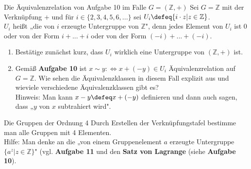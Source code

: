 \documentclass{uebblatt}
\begin{document}
\begin{aufgabe}{Die Äquivalenzrelation von Aufgabe 10 im Falle $G = (\mathbb{Z}, +)$}
Sei $G = \mathbb{Z}$ mit der Verknüpfung $+$ und für $i \in \{2, 3, 4, 5, 6, ...\}$ sei $U_i \defeq \{i \cdot z | z \in \mathbb{Z}\}$.\\
$U_i$ heißt „die von $i$ erzeugte Untergruppe von $\mathbb{Z}$", denn jedes Element von $U_i$ ist 0 oder von der Form $i + ... + i$ oder von der Form $(-i) + ... + (-i)$. 
\begin{enumerate}
\item Bestätige zunächst kurz, dass $U_i$ wirklich eine Untergruppe von $(\mathbb{Z}, +)$ ist.
\item Gemäß \textbf{Aufgabe 10} ist $x \sim y :\Leftrightarrow x + (-y) \in U_i$ Äquivalenzrelation auf $G = \mathbb{Z}$. Wie sehen die Äquivalenzklassen in diesem Fall explizit aus und wieviele verschiedene Äquivalenzklassen gibt es?\\
Hinweis: Man kann $x - y \defeq x + (-y)$ definieren und dann auch sagen, dass „$y$ von $x$ subtrahiert wird". \\
\end{enumerate}

\end{aufgabe}

\begin{aufgabe}{Die Gruppen der Ordnung 4}
Durch Erstellen der Verknüpfungstafel bestimme man alle Gruppen mit 4 Elementen.\\
Hilfe: Man denke an die „von einem Gruppenelement $a$ erzeugte Untergruppe $\{a^z | z \in \mathbb{Z}\}$" (vgl. \textbf{Aufgabe 11} und den \textbf{Satz von Lagrange} (siehe \textbf{Aufgabe 10}).
\end{aufgabe}
\end{document}
